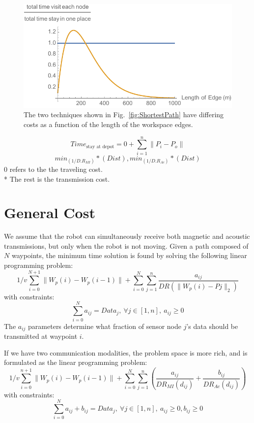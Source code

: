 \documentclass{article}
\begin{document}
\begin{figure}[htb]
\begin{center}
	\includegraphics[width=0.8\columnwidth]{CompareVisitEachToComm}
\end{center}
\caption{ 
 The two techniques shown in Fig.\ \ref{fig:ShortestPath} have differing costs as a function of the length of the workspace edges.
\label{fig:CompareTwoPathTechniques}}
\end{figure}


\begin{equation}
    \label{TimeEqn_Stationary}
    Time_{\textrm{stay at depot}} = 0 + \sum_{i=1}^{n} \|P_{i}-P_{o}\| 
    \end{equation} 
\begin{equation}
    \label{Transmission}
    min_{(1/D.R_{MI})}*(Dist),min_{(1/D.R_{Ac})}*(Dist)  
\end{equation}
0 refers to the the traveling cost.\\*
The rest is the transmission cost.

\section{General Cost}
We assume that the robot can simultaneously receive both magnetic and acoustic transmissions, but only when the robot is not moving.
Given a path composed of $N$ waypoints, the minimum time solution is found by solving the following linear programming problem:
\label{GeneralCost_SingleMode}
\begin{equation}
1/v \sum_{i=0}^{N+1} \|W_{p}(i)-W_{p}(i-1)\|+\sum_{i=0}^{N}\sum_{j=1}^{n}  \frac{ a_{ij}}{DR(\|W_{p}(i)-P{j}\|_2)}
\end{equation}
with constraints:
\label{GeneralCostSingle_Constraints}
\begin{equation}
\sum_{i=0}^{N} a_{ij} = Data_j,~ \forall j \in [1,n], ~
 a_{ij}\geq 0
\end{equation}
The $a_{ij}$ parameters determine what fraction of sensor node $j$'s data should be transmitted at waypoint $i$.

If we have two communication modalities, the problem space is more rich, and is formulated as the linear programming problem:
\label{GeneralCost_DoubleMode}
\begin{equation}
1/v \sum_{i=0}^{n+1} \|W_{p}(i)-W_{p}(i-1)\|+\sum_{i=0}^{N}\sum_{j=1}^{n} \left(  \frac{ a_{ij}}{DR_{MI}(d_{ij})}  +  \frac{ b_{ij}}{DR_{Ac}(d_{ij})}  \right)
\end{equation}
with constraints:
\label{GeneralCostDouble_Constraints}
\begin{equation}
\sum_{i=0}^{N} a_{ij}+b_{ij}=Data_j, ~\forall j \in [1,n], ~
 a_{ij}\geq 0,b_{ij}\geq 0
\end{equation}
\end{document}
